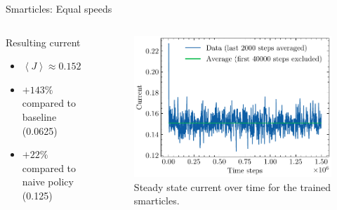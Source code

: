 \documentclass[10pt,xcolor=table, aspectratio=1610]{beamer}
\begin{document}
\begin{frame}{Smarticles: Equal speeds}
  \begin{columns}
    \begin{block}{Resulting current}
      \begin{itemize}
        \item $\left\langle J \right\rangle \approx 0.152$
        \item $+143\%$ compared to baseline (0.0625)
        \item $+22\%$ compared to naive policy (0.125)
      \end{itemize}
    \end{block}
    \begin{figure}
        \includegraphics[width=\textwidth]{../Thesis/img/results/equal_speeds.pdf}
        \caption*{Steady state current over time for the trained smarticles.}
      \end{figure}
  \end{columns}
\end{frame}
\end{document}
